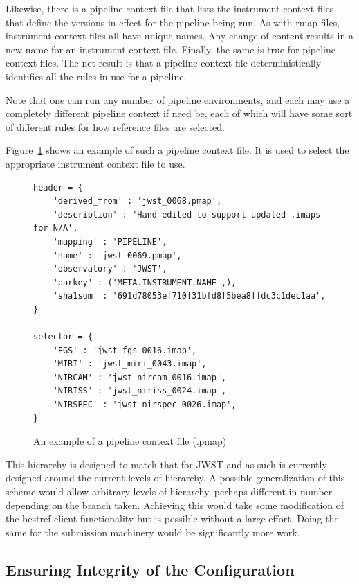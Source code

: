 \documentclass[final,authoryear,5p,times,twocolumn]{elsarticle}
\begin{document}
Likewise, there is a pipeline context file that lists the instrument context
files that define the versions in effect for the pipeline being run. As with
rmap files, instrument context files all have unique names. Any change of
content results in a new name for an instrument context file. Finally, the same
is true for pipeline context files. The net result is that a pipeline context
file deterministically identifies all the rules in use for a pipeline. 

Note that one can run any number of pipeline environments, and each may use a
completely different pipeline context if need be, each of which will have some
sort of different rules for how reference files are selected.

Figure~\ref{fig:example_pipeline_context} shows an example of such a pipeline context file.
It is used to select the appropriate instrument context file to use.

\begin{figure}
\begin{mdframed}
\begin{verbatim}
header = {
    'derived_from' : 'jwst_0068.pmap',
    'description' : 'Hand edited to support updated .imaps for N/A',
    'mapping' : 'PIPELINE',
    'name' : 'jwst_0069.pmap',
    'observatory' : 'JWST',
    'parkey' : ('META.INSTRUMENT.NAME',),
    'sha1sum' : '691d78053ef710f31bfd8f5bea8ffdc3c1dec1aa',
}

selector = {
    'FGS' : 'jwst_fgs_0016.imap',
    'MIRI' : 'jwst_miri_0043.imap',
    'NIRCAM' : 'jwst_nircam_0016.imap',
    'NIRISS' : 'jwst_niriss_0024.imap',
    'NIRSPEC' : 'jwst_nirspec_0026.imap',
}
\end{verbatim}
\end{mdframed}
\caption{An example of a pipeline context file (.pmap)}
\label{fig:example_pipeline_context}
\end{figure}


This hierarchy is designed to match that for JWST and as such is currently
designed around the current levels of hierarchy. A possible generalization
of this scheme would allow arbitrary levels of hierarchy, perhaps
different in number depending on the branch taken. Achieving this would
take some modification of the bestref client functionality but is possible
without a large effort. Doing the same for the submission machinery would 
be significantly more work. 

\subsection{Ensuring Integrity of the Configuration}
\end{document}
